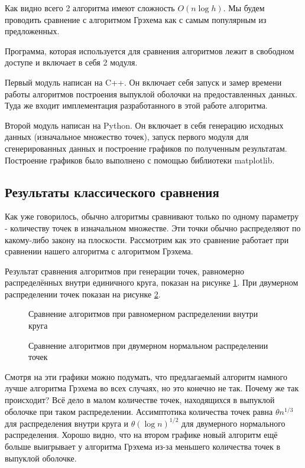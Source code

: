 Как видно всего 2 алгоритма имеют сложность $O(n \log h)$. Мы будем проводить сравнение с алгоритмом Грэхема как с самым популярным из предложенных.

Программа, которая используется для сравнения алгоритмов лежит в свободном доступе \cite{matrokhin2017github} и включает в себя 2 модуля.

Первый модуль написан на C++. Он включает себя запуск и замер времени работы алгоритмов построения выпуклой оболочки на предоставленных данных. Туда же входит имплементация разработанного в этой работе алгоритма.

Второй модуль написан на Python. Он включает в себя генерацию исходных данных (изначальное множество точек), запуск первого модуля для сгенерированных данных и построение графиков по полученным результатам. Построение графиков было выполнено с помощью библиотеки matplotlib.

\subsection{Результаты классического сравнения}

Как уже говорилось, обычно алгоритмы сравнивают только по одному параметру - количеству точек в изначальном множестве. Эти точки обычно распределяют по какому-либо закону на плоскости. Рассмотрим как это сравнение работает при сравнении нашего алгоритма с алгоритмом Грэхема.

Результат сравнения алгоритмов при генерации точек, равномерно распределённых внутри единичного круга, показан на рисунке \ref{img:classic_in_circle}. При двумерном распределении точек показан на рисунке \ref{img:classic_gauss}.

\begin{figure}[H]
	\centering
	
	\caption{Сравнение алгоритмов при равномерном распределении внутри круга}
	\label{img:classic_in_circle}
\end{figure}

\begin{figure}[H]
	\centering
	
	\caption{Сравнение алгоритмов при двумерном нормальном распределении точек}
	\label{img:classic_gauss}
\end{figure}

Смотря на эти графики можно подумать, что предлагаемый алгоритм намного лучше алгоритма Грэхема во всех случаях, но это конечно не так. Почему же так происходит? Всё дело в малом количестве точек, находящихся в выпуклой оболочке при таком распределении. Ассимптотика количества точек равна $\theta{n^{1/3}}$ для распределения внутри круга и $\theta{(\log n)^{1/2}}$ для двумерного нормального распределения\cite{algolist2010convexhull}. Хорошо видно, что на втором графике новый алгоритм ещё больше выигрывает у алгоритма Грэхема из-за меньшего количества точек в выпуклой оболочке.

